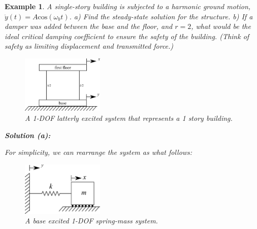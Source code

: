 \documentclass[12pt,letter]{article}
\newtheorem{ex}{Example}
\numberwithin{ex}{section} %
\newenvironment{example}{\begin{mdframed}[middlelinewidth=0.5mm]\begin{ex}\normalfont}{\end{ex}\end{mdframed}}
\numberwithin{re}{section} %
\numberwithin{vcs}{section} %
\begin{document}
				\begin{example}
		
					A single-story building is subjected to a harmonic ground motion, $\ddot{y}(t) = A \text{cos}(\omega_b t)$. a) Find the steady-state solution for the structure.  b) If a damper was added between the base and the floor, and $r=2$, what would be the ideal critical damping coefficient to ensure the safety of the building. (Think of safety as limiting displacement and transmitted force.) 
					\begin{figure}[H]
						\centering
						\includegraphics[width=0.35\textwidth]{../figures/base_excited_structure.png}
						\caption{A 1-DOF latterly excited system that represents a 1 story building. }
					\end{figure}				
								
					\noindent\textbf{Solution (a):}
						
					For simplicity, we can rearrange the system as what follows:
					\begin{figure}[H]
						\centering
						\includegraphics[width=0.35\textwidth]{../figures/base_excited_structure_simple.png}
						\caption{A base excited 1-DOF spring-mass system.}
					\end{figure}			
		

\end{example}
\end{document}
